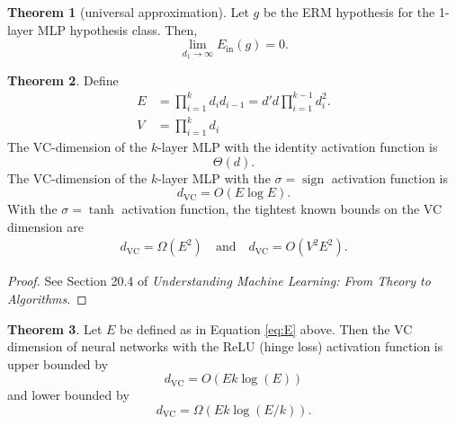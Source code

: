 \documentclass[10pt]{exam}
\theoremstyle{definition}
\newtheorem{theorem}{Theorem}
\DeclareMathOperator{\sign}{sign}
\newcommand{\Ein}{E_{\text{in}}}
\newcommand{\dvc}{{d_{\text{VC}}}}
\begin{document}
\newpage
\begin{theorem}[universal approximation]
    Let $g$ be the ERM hypothesis for the 1-layer MLP hypothesis class.
    Then,
    \begin{equation}
        \lim_{d_1\to\infty} \Ein(g) = 0
        .
    \end{equation}
\end{theorem}

\begin{theorem}
    Define
    \begin{align}
        \label{eq:E}
        E &= \prod_{i=1}^k d_i d_{i-1} = d'd \prod_{i=1}^{k-1} d_i^2.
        \\
        V &= \prod_{i=1}^k d_i
    \end{align}
    The VC-dimension of the $k$-layer MLP with the identity activation function is
    \begin{equation}
        \Theta(d)
        .
    \end{equation}
    The VC-dimension of the $k$-layer MLP with the $\sigma=\sign$ activation function is
    \begin{equation}
        \dvc = O(E \log E)
        .
    \end{equation}
    With the $\sigma=\tanh$ activation function, the tightest known bounds on the VC dimension are
    \begin{align}
        \dvc = \Omega(E^2) \quad\text{and}\quad
        \dvc = O(V^2 E^2)
        .
    \end{align}
\end{theorem}

\begin{proof}
    See Section 20.4 of \emph{Understanding Machine Learning: From Theory to Algorithms}.
\end{proof}

\begin{theorem}
    Let $E$ be defined as in Equation \eqref{eq:E} above.
    Then the VC dimension of neural networks with the ReLU (hinge loss) activation function is upper bounded by
    \begin{equation}
        \dvc = O(Ek\log(E))
    \end{equation}
    and lower bounded by
    \begin{equation}
        \dvc = \Omega(Ek\log(E/k)).
    \end{equation}
\end{theorem}
\end{document}
